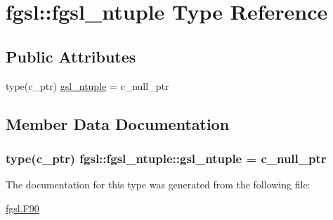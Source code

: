 \hypertarget{structfgsl_1_1fgsl__ntuple}{}\section{fgsl\+:\+:fgsl\+\_\+ntuple Type Reference}
\label{structfgsl_1_1fgsl__ntuple}
\subsection*{Public Attributes}
\begin{DoxyCompactItemize}
\item 
type(c\+\_\+ptr) \hyperlink{structfgsl_1_1fgsl__ntuple_a31e0903a9dba6912a095ff146a167722}{gsl\+\_\+ntuple} = c\+\_\+null\+\_\+ptr
\end{DoxyCompactItemize}


\subsection{Member Data Documentation}
\hypertarget{structfgsl_1_1fgsl__ntuple_a31e0903a9dba6912a095ff146a167722}{}
\subsubsection[{gsl\+\_\+ntuple}]{\setlength{\rightskip}{0pt plus 5cm}type(c\+\_\+ptr) fgsl\+::fgsl\+\_\+ntuple\+::gsl\+\_\+ntuple = c\+\_\+null\+\_\+ptr}\label{structfgsl_1_1fgsl__ntuple_a31e0903a9dba6912a095ff146a167722}


The documentation for this type was generated from the following file\+:\begin{DoxyCompactItemize}
\item 
\hyperlink{fgsl_8F90}{fgsl.\+F90}\end{DoxyCompactItemize}
